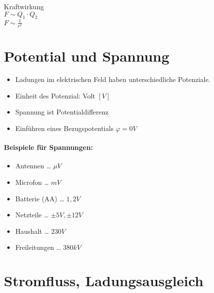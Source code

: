 \documentclass{scrreprt}
\begin{document}
Kraftwirkung\\
$F \sim Q_1 \cdot Q_2$\\
$F \sim \frac{1}{r^2}$\\

\section{Potential und Spannung}

\begin{itemize}
\item Ladungen im elektrischen Feld haben unterschiedliche Potenziale.
\item Einheit des Potenzial: Volt $[V]$
\item Spannung ist Potentialdifferenz
\item Einführen eines Bezugspotentials $\varphi = 0 V$
\end{itemize}

\paragraph{Beispiele für Spannungen:}
\begin{itemize}
\item Antennen … $\mu V$
\item Microfon … $m V $
\item Batterie (AA) … $1,2 V $
\item Netzteile … $\pm 5 V, \pm 12 V$
\item Haushalt … $230V$
\item Freileitungen … $380 kV$
\end{itemize}

\section{Stromfluss, Ladungsausgleich}
\end{document}
